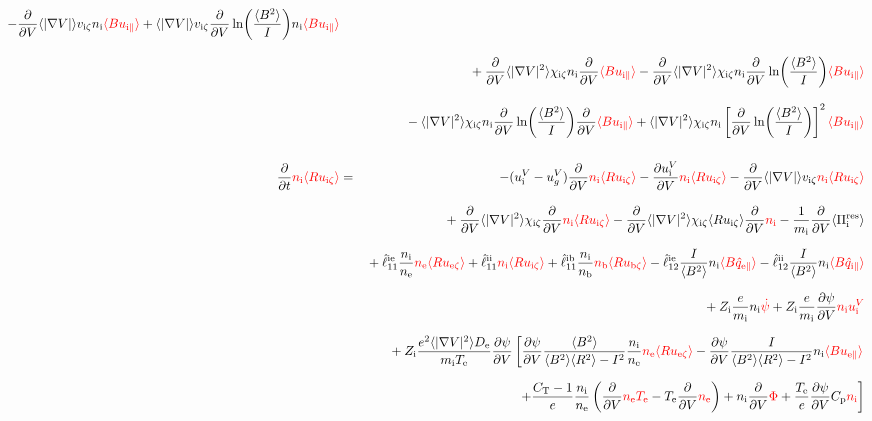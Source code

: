\documentclass[11pt]{article}
\def\r#1{{\rm#1}}
\def\aves#1{\langle#1\rangle}
\def\dd#1#2{\frac{\partial #1}{\partial #2}}
\def\para{\parallel}
\def\ddV{\frac{\partial}{\partial V}}
\def\mi{m_\r{i}}
\def\nee{n_\r{e}}
\def\ni{n_\r{i}}
\def\nb{n_\r{b}}
\def\Te{T_\r{e}}
\def\Zi{Z_\r{i}}
\def\uezt{u_{\r{e}\zeta}}
\def\uizt{u_{\r{i}\zeta}}
\def\ubzt{u_{\r{b}\zeta}}
\def\uepara{u_{\r{e}\para}}
\def\uipara{u_{\r{i}\para}}
\def\ubpara{u_{\r{b}\para}}
\def\qhatepara{\hat{q}_{\r{e}\para}}
\def\qhatipara{\hat{q}_{\r{i}\para}}
\def\uiV{u_\r{i}^V}
\def\ugV{u_{g}^V}
\def\bri{\aves{B^2}\aves{R^2} - I^2}
\def\ddt{\frac{\partial}{\partial t}}
\def\De{D_\r{e}}
\def\red#1{\textcolor{red}{#1}}
\begin{document}
\begin{eqnarray}
%
  - \ddV \aves{|\nabla V|} v_{\r{i}\zeta} \ni \red{\aves{B \uipara}}
%
  + \aves{|\nabla V|} v_{\r{i}\zeta} \ddV \ln
  \biggl(\frac{\aves{B^2}}{I}\biggl) \ni \red{\aves{B \uipara}}
\nonumber\\[3mm]&&{}
%
  + \ddV \aves{|\nabla V|^2} \chi_{\r{i}\zeta} \ni \ddV \red{\aves{B
  \uipara}}
%
  - \ddV \aves{|\nabla V|^2} \chi_{\r{i}\zeta} \ni \ddV
  \ln\biggl(\frac{\aves{B^2}}{I}\biggr) \red{\aves{B \uipara}}
\nonumber\\[3mm]&&{}
%
  - \aves{|\nabla V|^2} \chi_{\r{i}\zeta} \ni \ddV
  \ln\biggl(\frac{\aves{B^2}}{I}\biggr) \ddV \red{\aves{B
  \uipara}}
%
  + \aves{|\nabla V|^2} \chi_{\r{i}\zeta} \ni \left[\ddV
  \ln\biggl(\frac{\aves{B^2}}{I}\biggr)\right]^2 \red{\aves{B \uipara}}
\\[5mm]
  \ddt \red{\ni \aves{R \uizt}} &=&
%
  - (\uiV - \ugV) \ddV \red{\ni \aves{R \uizt}}
%
  - \dd{\uiV}{V} \red{\ni \aves{R \uizt}}
%
  - \ddV \aves{|\nabla V|} v_{\r{i}\zeta} \red{\ni \aves{R \uizt}}
\nonumber\\[3mm]&&{}
  + \ddV \aves{|\nabla V|^2} \chi_{\r{i}\zeta} \ddV \red{\ni \aves{R \uizt}}
  - \ddV \aves{|\nabla V|^2} \chi_{\r{i}\zeta} \aves{R \uizt}\ddV \red{\ni} 
  - \frac{1}{\mi} \ddV \aves{\Pi_\r{i}^\r{res}}
\nonumber\\[2.5mm]&&{}
%
  + \hat{\ell}_{11}^\r{ie} \frac{\ni}{\nee} \red{\nee \aves{R \uezt}}
  + \hat{\ell}_{11}^\r{ii} \red{\ni \aves{R \uizt}}
  + \hat{\ell}_{11}^\r{ib} \frac{\ni}{\nb} \red{\nb \aves{R \ubzt}}
%
  - \hat{\ell}_{12}^\r{ie} \frac{I}{\aves{B^2}} \ni \red{\aves{B \qhatepara}}
  - \hat{\ell}_{12}^\r{ii} \frac{I}{\aves{B^2}} \ni \red{\aves{B \qhatipara}}
\nonumber\\[2.5mm]&&{}
%
  + \Zi \frac{e}{\mi}              \ni \red{\dot{\psi}}
%
  + \Zi \frac{e}{\mi} \dd{\psi}{V} \red{\ni \uiV}
%
\nonumber\\[2.5mm]&&{}
%
%
  + \Zi \frac{e^2 \aves{|\nabla V|^2} \De}{\mi\Te} \dd{\psi}{V} 
%
    \left[  \dd{\psi}{V} \frac{\aves{B^2}}{\bri} \frac{\ni}{\nee}
            \red{\nee \aves{R \uezt}}
          - \dd{\psi}{V} \frac{I}{\bri} \ni \red{\aves{B \uepara}} \right.
\nonumber\\[2.5mm]&&{}
%
    \left.+ \frac{C_\r{T}-1}{e} \frac{\ni}{\nee}
     \left(\ddV \red{\nee \Te} - \Te \ddV \red{\nee} \right)
	  + \ni \ddV \red{\Phi}
	  + \frac{\Te}{e} \dd{\psi}{V} C_\r{p} \red{\ni} \right]

\end{eqnarray}
\end{document}
